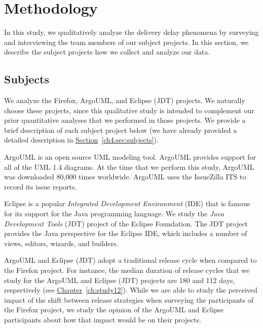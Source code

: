 \section{Methodology} \label{ch6:studysettings}

In this study, we qualitatively analyze the delivery delay phenomena by
surveying and interviewing the team members of our subject projects. In this
section, we describe the subject projects how we collect and analyze our data.

\subsection{Subjects}

We analyze the Firefox, ArgoUML, and Eclipse (JDT) projects. We naturally choose
these projects, since this qualitative study is intended to complement our prior
quantitative analyses that we performed in those projects. We provide a brief
description of each subject project below (we have already provided a detailed
description in \hyperref[ch4:sec:subjects]{Section}~\ref{ch4:sec:subjects}).

ArgoUML is an open source UML modeling tool. ArgoUML provides support for all of
the UML 1.4 diagrams. At the time that we perform this study, ArgoUML was
downloaded 80,000 times worldwide.
ArgoUML uses the IssueZilla ITS to record its issue
reports.

Eclipse is a popular {\em Integrated Development Environment} (IDE) that is
famous for its support for the Java programming
language. We study the {\em Java
Development Tools} (JDT) project of the Eclipse
Foundation.
The JDT project provides the Java perspective for the Eclipse IDE, which
includes a number of views, editors, wizards, and builders. 

ArgoUML and Eclipse (JDT) adopt a traditional release cycle when compared to the
Firefox project. For instance, the median duration of release cycles that we
study for the ArgoUML and Eclipse (JDT) projects are 180 and 112 days,
respectively (see \hyperref[ch:study12]{Chapter}~\ref{ch:study12}). While we are
able to study the perceived impact of the shift between release strategies when
surveying the participants of the Firefox project, we study the opinion of the
ArgoUML and Eclipse participants about how that impact would be on their
projects.

